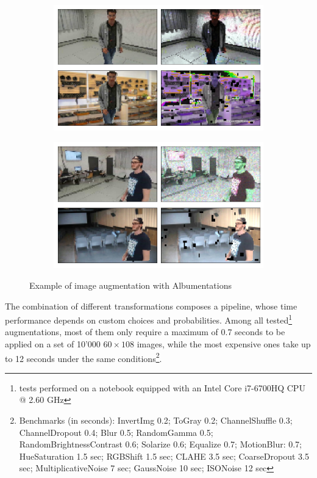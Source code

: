 \begin{figure}[!h]
	\begin{center}
		\begin{subfigure}[h]{0.49\textwidth}
			\centering
			\includegraphics[width=1\textwidth]{"contents/images/05-imgaug-example-1"}
		\end{subfigure}
		\hfill
		\begin{subfigure}[h]{0.49\textwidth}
			\centering
			\includegraphics[width=1\textwidth]{"contents/images/05-imgaug-example-2"}
		\end{subfigure}
	\end{center}
	\vspace{-0.5cm}
	\caption[Example of image augmentation with Albumentations]{Example of image augmentation with Albumentations}
	\label{fig:albumentation-example}
\end{figure}

The combination of different transformations composes a pipeline, whose time performance depends on custom choices and probabilities. Among all tested\footnote{tests performed on a notebook equipped with an Intel Core i7-6700HQ CPU @ 2.60 GHz} augmentations, most of them only require a maximum of 0.7 seconds to be applied on a set of 10'000 $60 \times 108$ images, while the most expensive ones take up to 12 seconds under the same conditions\footnote{Benchmarks (in seconds): InvertImg 0.2; ToGray 0.2; ChannelShuffle 0.3; ChannelDropout 0.4; Blur 0.5; RandomGamma 0.5; RandomBrightnessContrast 0.6; Solarize 0.6; Equalize 0.7; MotionBlur: 0.7; HueSaturation 1.5 sec; RGBShift 1.5 sec; CLAHE 3.5 sec; CoarseDropout 3.5 sec; MultiplicativeNoise 7 sec; GaussNoise 10 sec; ISONoise 12 sec}.

